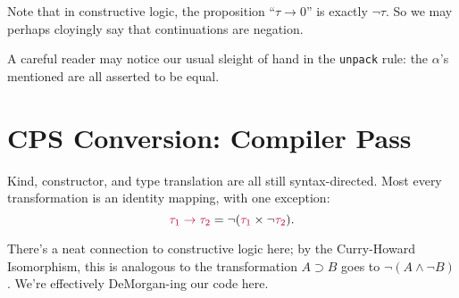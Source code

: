 \documentclass{article}
\newcommand{\pack}{\text{\texttt{pack} }}
\newcommand{\unpack}{\text{\texttt{unpack} }}
\newcommand{\iin}{\text{ \texttt{in} }}
\newcommand{\halt}{\text{\texttt{halt}}}
\newcommand{\llet}{\text{\texttt{let} }}
\newcommand{\as}{\text{ \texttt{as} }}
\newcommand{\src}[1]{{\color{purple}#1}}
\begin{document}

Note that in constructive logic, the proposition ``$\tau \rightarrow 0$'' is
exactly $\neg\tau$. So we may perhaps cloyingly say that continuations are
negation.

A careful reader may notice our usual sleight of hand in the \texttt{unpack}
rule: the $\alpha$'s mentioned are all asserted to be equal.

\section{CPS Conversion: Compiler Pass}

Kind, constructor, and type translation are all still syntax-directed. Most
every transformation is an identity mapping, with one exception:
\[
\src{\tau_1\rightarrow\tau_2} = \neg(\src{\tau_1} \times \neg \src{\tau_2}).
\]

There's a neat connection to constructive logic here; by the Curry-Howard
Isomorphism, this is analogous to the transformation $A\supset B$ goes to
$\neg(A\land \neg B)$. We're effectively DeMorgan-ing our code here.
\end{document}
